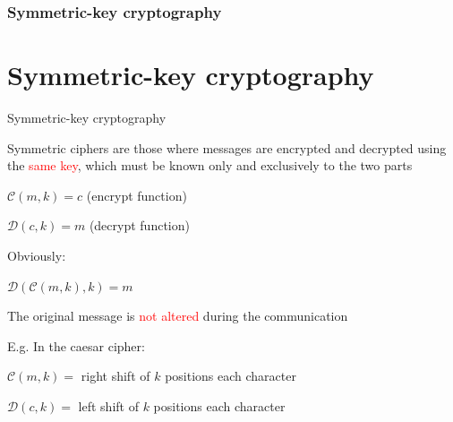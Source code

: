 \section[Section]{Symmetric-key cryptography}
\part{Symmetric-key cryptography}

\begin{frame}{Symmetric-key cryptography}

  Symmetric ciphers are those where messages are encrypted and decrypted using the \textcolor{red}{same key}, which must be known only and exclusively to the two parts
  
  \medskip

  \phantom{padding}$\mathcal{C}(m, k) = c$ (encrypt function)
    
  \phantom{padding}$\mathcal{D}(c, k) = m$ (decrypt function)
  
  \medskip

  Obviously:
  
  \phantom{padding}$\mathcal{D}(\mathcal{C}(m, k), k) = m$ 
  
  \phantom{padding}The original message is \textcolor{red}{not altered} during the communication
  
  \medskip
  
  E.g. In the caesar cipher:
  
  \phantom{padding}$\mathcal{C}(m, k) = $ right shift of $k$ positions each character
  
  \phantom{padding}$\mathcal{D}(c, k) = $ left shift of $k$ positions each character

\end{frame}

